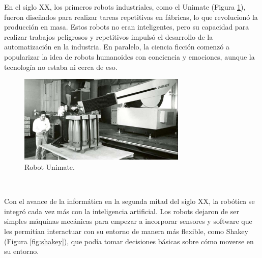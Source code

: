 En el siglo XX, los primeros robots industriales, como el Unimate (Figura \ref{fig:unimate}), fueron diseñados para realizar tareas repetitivas en fábricas, lo que revolucionó la producción en masa. Estos robots no eran inteligentes, pero su capacidad para realizar trabajos peligrosos y repetitivos impulsó el desarrollo de la automatización en la industria. En paralelo, la ciencia ficción comenzó a popularizar la idea de robots humanoides con conciencia y emociones, aunque la tecnología no estaba ni cerca de eso.\\

\begin{figure} [h!]
  \begin{center}
    \includegraphics[width=8cm]{figs/unimate}
  \end{center}
  \caption{Robot Unimate.}
  \label{fig:unimate}
\end{figure}\




Con el avance de la informática en la segunda mitad del siglo XX, la robótica se integró cada vez más con la inteligencia artificial. Los robots dejaron de ser simples máquinas mecánicas para empezar a incorporar sensores y software que les permitían interactuar con su entorno de manera más flexible, como Shakey (Figura \ref{fig:shakey}), que podía tomar decisiones básicas sobre cómo moverse en su entorno.

